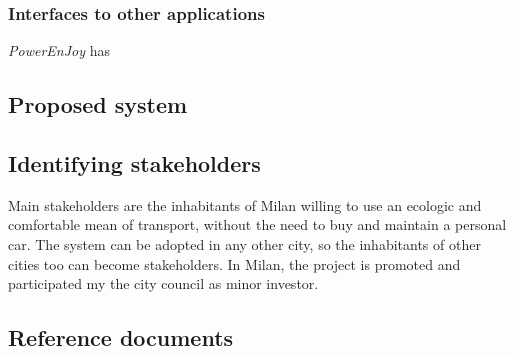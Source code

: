 \documentclass{article}
\begin{document}
			\subsubsection{Interfaces to other applications}
			\textit{PowerEnJoy}  has
						
				  	

		\subsection{Proposed system}

		\subsection{Identifying stakeholders}
			Main stakeholders are the inhabitants of Milan willing to use an ecologic and comfortable mean of transport, without the need to buy and maintain a personal car.
			The system can be adopted in any other city, so the inhabitants of other cities too can become stakeholders.
			In Milan, the project is promoted and participated my the city council as minor investor.

		\subsection{Reference documents}

	\newpage
\end{document}
